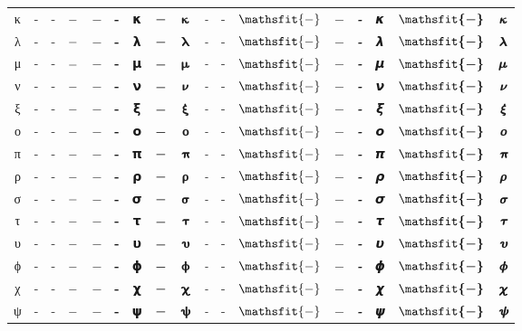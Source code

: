 \documentclass{standalone}
\newcommand{\SANS}[1]{\ifmmode\mathsf{#1}\else\textsf{#1}\fi}
\newcommand{\BSANS}[1]{\ifmmode\boldsymbol{\mathsf{#1}}\else\textbf{\textsf{#1}}\fi}
\newcommand{\ISANS}[1]{\ifmmode\mathsfit{#1}\else\textit{\textsf{#1}}\fi}
\newcommand{\BISANS}[1]{\ifmmode\bm{\mathsfit{#1}}\else\textbf{\textsf{\textit{#1}}}\fi}
\begin{document}
\begin{tabular}{c|cc|cc|cc|cc|cc|cc|cc|cc}
κ & \SANS{-} & - & $\SANS{-}$ & $-$ & \BSANS{-} & 𝝹 & $\BSANS{-}$ & $𝝹$ & \ISANS{-} & - & $\ISANS{-}$ & $-$ & \BISANS{-} & 𝞳 & $\BISANS{-}$ & $𝞳$ \\
λ & \SANS{-} & - & $\SANS{-}$ & $-$ & \BSANS{-} & 𝝺 & $\BSANS{-}$ & $𝝺$ & \ISANS{-} & - & $\ISANS{-}$ & $-$ & \BISANS{-} & 𝞴 & $\BISANS{-}$ & $𝞴$ \\
μ & \SANS{-} & - & $\SANS{-}$ & $-$ & \BSANS{-} & 𝝻 & $\BSANS{-}$ & $𝝻$ & \ISANS{-} & - & $\ISANS{-}$ & $-$ & \BISANS{-} & 𝞵 & $\BISANS{-}$ & $𝞵$ \\
ν & \SANS{-} & - & $\SANS{-}$ & $-$ & \BSANS{-} & 𝝼 & $\BSANS{-}$ & $𝝼$ & \ISANS{-} & - & $\ISANS{-}$ & $-$ & \BISANS{-} & 𝞶 & $\BISANS{-}$ & $𝞶$ \\
ξ & \SANS{-} & - & $\SANS{-}$ & $-$ & \BSANS{-} & 𝝽 & $\BSANS{-}$ & $𝝽$ & \ISANS{-} & - & $\ISANS{-}$ & $-$ & \BISANS{-} & 𝞷 & $\BISANS{-}$ & $𝞷$ \\
ο & \SANS{-} & - & $\SANS{-}$ & $-$ & \BSANS{-} & 𝝾 & $\BSANS{-}$ & $𝝾$ & \ISANS{-} & - & $\ISANS{-}$ & $-$ & \BISANS{-} & 𝞸 & $\BISANS{-}$ & $𝞸$ \\
π & \SANS{-} & - & $\SANS{-}$ & $-$ & \BSANS{-} & 𝝿 & $\BSANS{-}$ & $𝝿$ & \ISANS{-} & - & $\ISANS{-}$ & $-$ & \BISANS{-} & 𝞹 & $\BISANS{-}$ & $𝞹$ \\
ρ & \SANS{-} & - & $\SANS{-}$ & $-$ & \BSANS{-} & 𝞀 & $\BSANS{-}$ & $𝞀$ & \ISANS{-} & - & $\ISANS{-}$ & $-$ & \BISANS{-} & 𝞺 & $\BISANS{-}$ & $𝞺$ \\
σ & \SANS{-} & - & $\SANS{-}$ & $-$ & \BSANS{-} & 𝞂 & $\BSANS{-}$ & $𝞂$ & \ISANS{-} & - & $\ISANS{-}$ & $-$ & \BISANS{-} & 𝞼 & $\BISANS{-}$ & $𝞼$ \\
τ & \SANS{-} & - & $\SANS{-}$ & $-$ & \BSANS{-} & 𝞃 & $\BSANS{-}$ & $𝞃$ & \ISANS{-} & - & $\ISANS{-}$ & $-$ & \BISANS{-} & 𝞽 & $\BISANS{-}$ & $𝞽$ \\
υ & \SANS{-} & - & $\SANS{-}$ & $-$ & \BSANS{-} & 𝞄 & $\BSANS{-}$ & $𝞄$ & \ISANS{-} & - & $\ISANS{-}$ & $-$ & \BISANS{-} & 𝞾 & $\BISANS{-}$ & $𝞾$ \\
ϕ & \SANS{-} & - & $\SANS{-}$ & $-$ & \BSANS{-} & 𝞍 & $\BSANS{-}$ & $𝞍$ & \ISANS{-} & - & $\ISANS{-}$ & $-$ & \BISANS{-} & 𝟇 & $\BISANS{-}$ & $𝟇$ \\
χ & \SANS{-} & - & $\SANS{-}$ & $-$ & \BSANS{-} & 𝞆 & $\BSANS{-}$ & $𝞆$ & \ISANS{-} & - & $\ISANS{-}$ & $-$ & \BISANS{-} & 𝟀 & $\BISANS{-}$ & $𝟀$ \\
ψ & \SANS{-} & - & $\SANS{-}$ & $-$ & \BSANS{-} & 𝞇 & $\BSANS{-}$ & $𝞇$ & \ISANS{-} & - & $\ISANS{-}$ & $-$ & \BISANS{-} & 𝟁 & $\BISANS{-}$ & $𝟁$ \\

\end{tabular}
\end{document}
